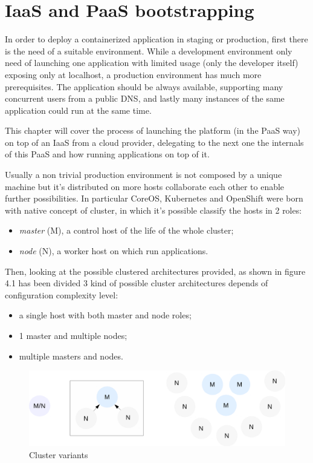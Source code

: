 \chapter{IaaS and PaaS bootstrapping}\label{iaas-and-paas-bootstrapping}

In order to deploy a containerized application in staging or production, first there is the need of a suitable environment.  While a development environment only need of launching one application with limited usage (only the developer itself) exposing only at localhost, a production environment has much more prerequisites.  The application should be always available, supporting many concurrent users from a public DNS, and lastly many instances of the same application could run at the same time.

This chapter will cover the process of launching the platform (in the PaaS way) on top of an IaaS from a cloud provider, delegating to the next one the internals of this PaaS and how running applications on top of it.

Usually a non trivial production environment is not composed by a unique machine but it's distributed on more hosts collaborate each other to enable further possibilities.  In particular CoreOS, Kubernetes and OpenShift were born with native concept of cluster, in which it's possible classify the hosts in 2 roles:
\begin{itemize}
\item \textit{master} (M), a control host of the life of the whole cluster;
\item \textit{node} (N), a worker host on which run applications.
\end{itemize}

Then, looking at the possible clustered architectures provided, as shown in figure 4.1 has been divided 3 kind of possible cluster architectures depends of configuration complexity level:
\begin{itemize}
\item a single host with both master and node roles;
\item 1 master and multiple nodes;
\item multiple masters and nodes.
\end{itemize}

\begin{figure}[htbp]
\centering
\includegraphics{media/ch4-clusters.png}
\caption{Cluster variants}
\end{figure}

